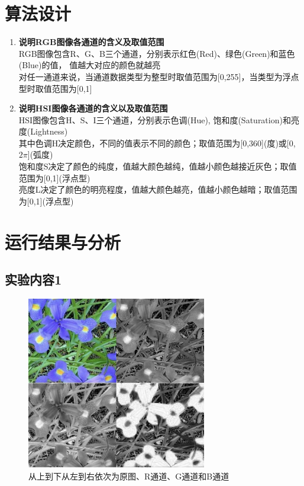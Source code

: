 \documentclass[a4paper]{ctexart}
\begin{document}
  \section{算法设计}
  \begin{enumerate}
    \item \textbf{说明RGB图像各通道的含义及取值范围}\\
    RGB图像包含R、G、B三个通道，分别表示红色(Red)、绿色(Green)和蓝色(Blue)的值，
    值越大对应的颜色就越亮\\
    对任一通道来说，当通道数据类型为整型时取值范围为[0,255]，当类型为浮点型时取值范围为[0,1]
    \item \textbf{说明HSI图像各通道的含义以及取值范围}\\
    HSI图像包含H、S、I三个通道，分别表示色调(Hue), 饱和度(Saturation)和亮度(Lightness)\\
    其中色调H决定颜色，不同的值表示不同的颜色；取值范围为[0,360](度)或[0,$2\pi$](弧度)\\
    饱和度S决定了颜色的纯度，值越大颜色越纯，值越小颜色越接近灰色；取值范围为[0,1](浮点型)\\
    亮度L决定了颜色的明亮程度，值越大颜色越亮，值越小颜色越暗；取值范围为[0,1](浮点型)
  \end{enumerate}

  \newpage
  \section{运行结果与分析}
  \subsection*{实验内容1}
  \begin{figure}[H]
    \centering
      \includegraphics*[width=0.7\textwidth]{fig/R-G-B.png}
      \caption{从上到下从左到右依次为原图、R通道、G通道和B通道}
  \end{figure}
\end{document}

